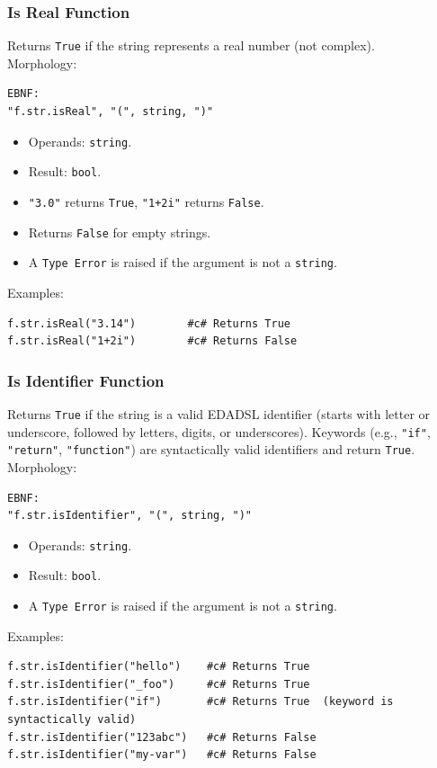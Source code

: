 \subsubsection{Is Real Function}
Returns \texttt{True} if the string represents a real number (not complex). \\
Morphology:
\begin{verbatim}
EBNF:
"f.str.isReal", "(", string, ")"
\end{verbatim}
\begin{itemize}
\item Operands: \texttt{string}.
\item Result: \texttt{bool}.
\item \texttt{"3.0"} returns \texttt{True}, \texttt{"1+2i"} returns \texttt{False}.
\item Returns \texttt{False} for empty strings.
\item A \texttt{Type Error} is raised if the argument is not a \texttt{string}.
\end{itemize}
Examples:
\begin{verbatim}
f.str.isReal("3.14")        #c# Returns True
f.str.isReal("1+2i")        #c# Returns False
\end{verbatim}

\subsubsection{Is Identifier Function}
Returns \texttt{True} if the string is a valid EDADSL identifier (starts with letter or underscore, followed by letters, digits, or underscores). Keywords (e.g., \texttt{"if"}, \texttt{"return"}, \texttt{"function"}) are syntactically valid identifiers and return \texttt{True}. \\
Morphology:
\begin{verbatim}
EBNF:
"f.str.isIdentifier", "(", string, ")"
\end{verbatim}
\begin{itemize}
\item Operands: \texttt{string}.
\item Result: \texttt{bool}.
\item A \texttt{Type Error} is raised if the argument is not a \texttt{string}.
\end{itemize}
Examples:
\begin{verbatim}
f.str.isIdentifier("hello")    #c# Returns True
f.str.isIdentifier("_foo")     #c# Returns True
f.str.isIdentifier("if")       #c# Returns True  (keyword is syntactically valid)
f.str.isIdentifier("123abc")   #c# Returns False
f.str.isIdentifier("my-var")   #c# Returns False
\end{verbatim}

